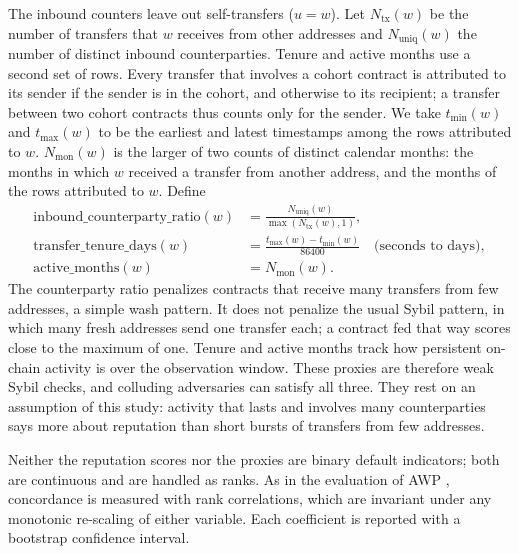 The inbound counters leave out self-transfers ($u=w$). Let $N_{\mathrm{tx}}(w)$ be the number of transfers that $w$ receives from other addresses and $N_{\mathrm{uniq}}(w)$ the number of distinct inbound counterparties. Tenure and active months use a second set of rows. Every transfer that involves a cohort contract is attributed to its sender if the sender is in the cohort, and otherwise to its recipient; a transfer between two cohort contracts thus counts only for the sender. We take $t_{\min}(w)$ and $t_{\max}(w)$ to be the earliest and latest timestamps among the rows attributed to $w$. $N_{\mathrm{mon}}(w)$ is the larger of two counts of distinct calendar months: the months in which $w$ received a transfer from another address, and the months of the rows attributed to $w$. Define
\begin{align}
\mathrm{inbound\_counterparty\_ratio}(w)
&=
\frac{N_{\mathrm{uniq}}(w)}{\max(N_{\mathrm{tx}}(w),1)},
\label{eq:counterparty-ratio}\\
\mathrm{transfer\_tenure\_days}(w)
&=
\frac{t_{\max}(w)-t_{\min}(w)}{86400}\quad\text{(seconds to days)},
\label{eq:tenure}\\
\mathrm{active\_months}(w)
&=
N_{\mathrm{mon}}(w).
\label{eq:active-months}
\end{align}
The counterparty ratio penalizes contracts that receive many transfers from few addresses, a simple wash pattern. It does not penalize the usual Sybil pattern, in which many fresh addresses send one transfer each; a contract fed that way scores close to the maximum of one. Tenure and active months track how persistent on-chain activity is over the observation window. These proxies are therefore weak Sybil checks, and colluding adversaries can satisfy all three. They rest on an assumption of this study: activity that lasts and involves many counterparties says more about reputation than short bursts of transfers from few addresses.


Neither the reputation scores nor the proxies are binary default indicators; both are continuous and are handled as ranks. As in the evaluation of AWP \parencite{do2023awp}, concordance is measured with rank correlations, which are invariant under any monotonic re-scaling of either variable. Each coefficient is reported with a bootstrap confidence interval.

